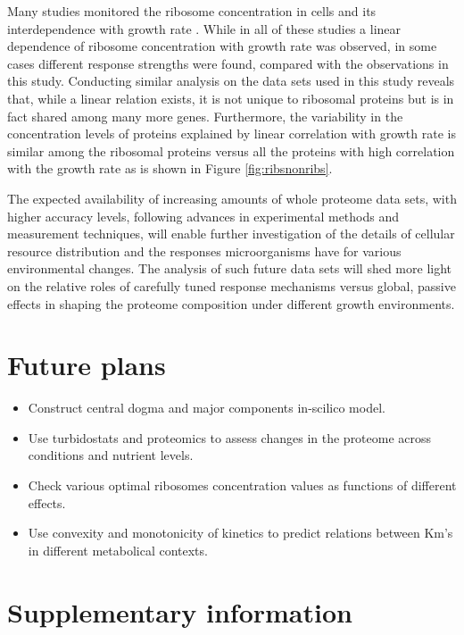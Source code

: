 \documentclass[notitlepage]{article}
\begin{document}
Many studies monitored the ribosome concentration in cells and its interdependence with growth rate \cite{Scott2010, Bremer1987, Schaechter1958, ingraham1983growth, Zaslaver2009}.
While in all of these studies a linear dependence of ribosome concentration with growth rate was observed, in some cases different response strengths were found, compared with the observations in this study.
Conducting similar analysis on the data sets used in this study reveals that, while a linear relation exists, it is not unique to ribosomal proteins but is in fact shared among many more genes.
Furthermore, the variability in the concentration levels of proteins explained by linear correlation with growth rate is similar among the ribosomal proteins versus all the proteins with high correlation with the growth rate as is shown in Figure \ref{fig:ribsnonribs}.

The expected availability of increasing amounts of whole proteome data sets, with higher accuracy levels, following advances in experimental methods and measurement techniques, will enable further investigation of the details of cellular resource distribution and the responses microorganisms have for various environmental changes.
The analysis of such future data sets will shed more light on the relative roles of carefully tuned response mechanisms versus global, passive effects in shaping the proteome composition under different growth environments.

\section{Future plans}
\begin{itemize}
\item Construct central dogma and major components in-scilico model.
\item Use turbidostats and proteomics to assess changes in the proteome across conditions and nutrient levels.
\item Check various optimal ribosomes concentration values as functions of different effects.
\item Use convexity and monotonicity of kinetics to predict relations between Km's in different metabolical contexts.
\end{itemize}
\section{Supplementary information}
\end{document}

